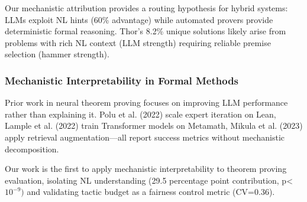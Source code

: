 Our mechanistic attribution provides a routing hypothesis for hybrid systems: LLMs exploit NL hints (60\% advantage) while automated provers provide deterministic formal reasoning. Thor's 8.2\% unique solutions likely arise from problems with rich NL context (LLM strength) requiring reliable premise selection (hammer strength).

\subsubsection{Mechanistic Interpretability in Formal Methods}

Prior work in neural theorem proving focuses on improving LLM performance rather than explaining it. Polu et al. (2022) scale expert iteration on Lean, Lample et al. (2022) train Transformer models on Metamath, Mikula et al. (2023) apply retrieval augmentation---all report success metrics without mechanistic decomposition.

Our work is the first to apply mechanistic interpretability to theorem proving evaluation, isolating NL understanding (29.5 percentage point contribution, p<$10^{-9})$ and validating tactic budget as a fairness control metric (CV=0.36).
